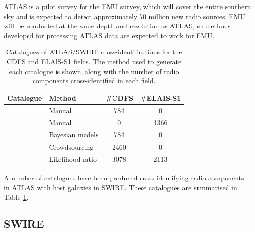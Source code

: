 \documentclass[fleqn,usenatbib,usedcolumn]{mnras}
\begin{document}
    ATLAS is a pilot survey for the EMU \citep{norris11} survey, which will
    cover the entire southern sky and is expected to detect approximately 70
    million new radio sources. EMU will be conducted at the same depth and
    resolution as ATLAS, so methods developed for processing ATLAS data are
    expected to work for EMU.

    \begin{table}
      \caption{Catalogues of ATLAS/SWIRE cross-identifications for the CDFS
        and ELAIS-S1 fields. The method used to generate each catalogue is
        shown, along with the number of radio components cross-identified in each
        field.}
      \label{tab:atlas-cids}
      \begin{tabular}{ll|cc}
        \hline
        Catalogue & Method & \#CDFS & \#ELAIS-S1\\
        \hline
        \citet{norris06} & Manual & 784 & 0\\
        \citet{middelberg08} & Manual & 0 & 1366\\
        \citet{fan15} & Bayesian models & 784 & 0\\
        \citet{wong17} & Crowdsourcing & 2460 & 0 \\
        \citet{weston17} & Likelihood ratio & 3078 & 2113\\
        \hline
      \end{tabular}
    \end{table}

    A number of catalogues have been produced cross-identifying radio components
    in ATLAS with host galaxies in SWIRE. These catalogues are summarised in
    Table \ref{tab:atlas-cids}.



  \subsection{SWIRE}\label{sec:swire}
\end{document}
